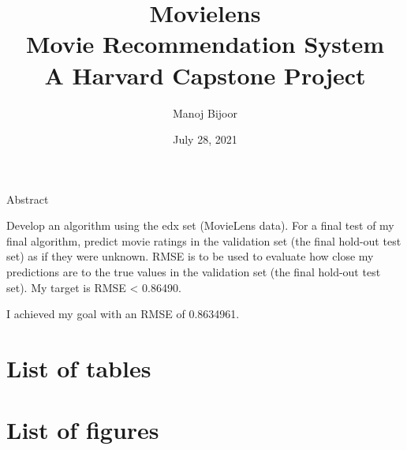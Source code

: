 \documentclass[
]{article}
\title{Movielens\\
Movie Recommendation System\\
A Harvard Capstone Project}
\author{Manoj Bijoor}
\date{July 28, 2021}
\begin{document}
\maketitle



\newpage

\newpage

\begin{center}

\hypertarget{Abstract}{}
\large{Abstract}

\end{center}

\bigskip

Develop an algorithm using the edx set (MovieLens data). For a final
test of my final algorithm, predict movie ratings in the validation set
(the final hold-out test set) as if they were unknown. RMSE is to be
used to evaluate how close my predictions are to the true values in the
validation set (the final hold-out test set). My target is RMSE
\textless{} 0.86490.

I achieved my goal with an RMSE of 0.8634961.

\newpage 
\clearpage
{}
\setcounter{secnumdepth}{5}
\setcounter{tocdepth}{5}

\cleardoublepage  \hypertarget{toc}{}
\bookmark[dest=toc,level=chapter]{\contentsname} \tableofcontents

\clearpage

\newpage
\clearpage
{}

\hypertarget{list-of-tables}{%
\section*{List of tables}\label{list-of-tables}}

\renewcommand{\listtablename}{}

\listoftables
\clearpage

\newpage
\clearpage
{}

\hypertarget{list-of-figures}{%
\section*{List of figures}\label{list-of-figures}}

\renewcommand{\listfigurename}{}
\end{document}
